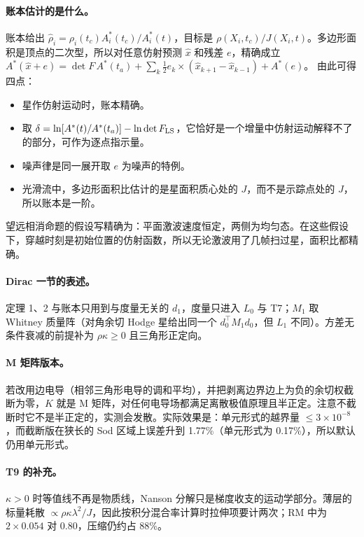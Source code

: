 \paragraph{账本估计的是什么。}账本给出 $\hat\rho_i=\rho_i(t_c)A^\ast_i(t_c)/A^\ast_i(t)$，目标是 $\rho(X_i,t_c)/J(X_i,t)$。多边形面积是顶点的二次型，所以对任意仿射预测 $\hat x$ 和残差 $e$，精确成立
$A^\ast(\hat x+e)=\det F\,A^\ast(t_a)+\sum_k\frac12e_k\times(\hat x_{k+1}-\hat x_{k-1})+A^\ast(e)$。
由此可得四点：
\begin{itemize}
\item 星作仿射运动时，账本精确。
\item 取 $\delta=\ln[A^\ast(t)/A^\ast(t_a)]-\ln\det F_{\rm LS}$，它恰好是一个增量中仿射运动解释不了的部分，可作为逐点指示量。
\item 噪声律是同一展开取 $e$ 为噪声的特例。
\item 光滑流中，多边形面积比估计的是星面积质心处的 $J$，而不是示踪点处的 $J$，所以账本是一阶。
\end{itemize}
望远相消命题的假设写精确为：平面激波速度恒定，两侧为均匀态。在这些假设下，穿越时刻是初始位置的仿射函数，所以无论激波用了几帧扫过星，面积比都精确。

\paragraph{Dirac 一节的表述。}定理 1、2 与账本只用到与度量无关的 $d_1$，度量只进入 $L_0$ 与 T7；$M_1$ 取 Whitney 质量阵（对角余切 Hodge 星给出同一个 $d_0^\top M_1d_0$，但 $L_1$ 不同）。方差无条件衰减的前提补为 $\rho\kappa\ge0$ 且三角形正定向。

\paragraph{M 矩阵版本。}若改用边电导（相邻三角形电导的调和平均），并把剥离边界边上为负的余切权截断为零，$K$ 就是 M 矩阵，对任何电导场都满足离散极值原理且半正定。注意不截断时它不是半正定的，实测会发散。实际效果是：单元形式的越界量 $\le3\times10^{-8}$，而截断版在狭长的 Sod 区域上误差升到 1.77\%（单元形式为 0.17\%），所以默认仍用单元形式。

\paragraph{T9 的补充。}$\kappa>0$ 时等值线不再是物质线，Nanson 分解只是梯度收支的运动学部分。薄层的标量耗散 $\propto\rho\kappa\lambda^2/J$，因此按积分混合率计算时拉伸项要计两次；RM 中为 $2\times0.054$ 对 $0.80$，压缩仍约占 88\%。


